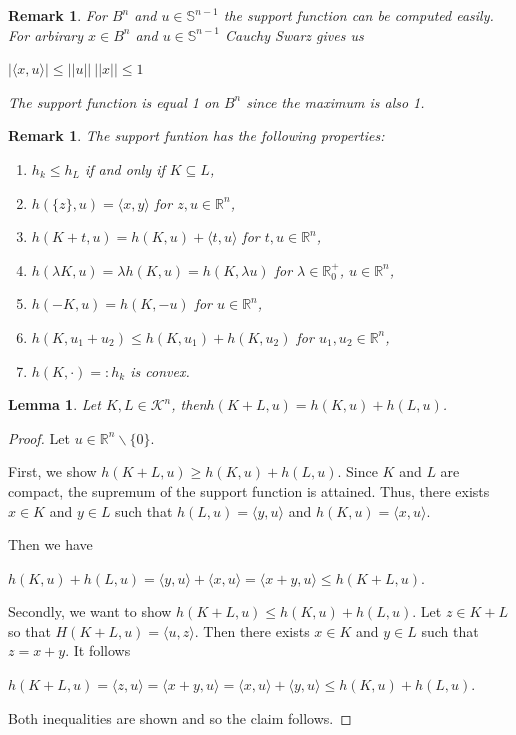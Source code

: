 \documentclass[a4paper]{book}
\newtheorem{lemma}[theorem]{Lemma}%
\newtheorem{remark}[theorem]{Remark}%
\numberwithin{theorem}{section}%
\begin{document}
\begin{remark}
	For $B^{n}$ and $u\in\mathbb{S}^{n-1}$ the support function can be computed easily. For arbirary $x\in B^{n}$ and $u\in\mathbb{S}^{n-1}$ Cauchy Swarz gives us
	\begin{center}
		$|\langle x,u\rangle|\leq||u||\:||x||\leq1$
	\end{center}
	The support function is equal 1 on $B^{n}$ since the maximum is also 1.
\end{remark}

\begin{remark}
	The support funtion has the following properties:
	\begin{enumerate}
		\item $h_{k}\leq h_{L}$ if and only if $K\subseteq L$,
		\item $h(\{z\},u)=\langle x,y\rangle$ for $z,u\in\mathbb{R}^{n}$,
		\item $h(K+t,u)=h(K,u)+\langle t,u\rangle$ for $t,u\in\mathbb{R}^{n}$,
		\item $h(\lambda K, u)=\lambda h(K,u)=h(K,\lambda u)$ for $\lambda\in\mathbb{R}_{0}^{+}$, $u\in\mathbb{R}^{n}$,
		\item $h(-K,u)=h(K,-u)$ for $u\in\mathbb{R}^{n}$,
		\item $h(K,u_{1}+u_{2})\leq h(K,u_{1})+h(K,u_{2})$ for $u_{1},u_{2}\in\mathbb{R}^{n}$,
		\item $h(K,\cdot)=: h_{k}$ is convex.
	\end{enumerate}
\end{remark}

\begin{lemma}
	Let $K,L\in\mathscr{K}^{n}$, then$h(K+L,u)=h(K,u)+h(L,u)$.
\end{lemma}
\begin{proof}
	Let $u\in\mathbb{R}^{n}\backslash\{0\}$.

    First, we show $h(K+L,u)\geq h(K,u)+h(L,u)$. Since $K$ and $L$ are compact, the supremum of the support function is attained. Thus, there exists $x\in K$ and $y\in L$ such that $h(L,u)=\langle y,u\rangle$ and $h(K,u)=\langle x,u\rangle$.

    Then we have
    \begin{center}
        $h(K,u)+h(L,u)=\langle y,u\rangle+\langle x,u\rangle=\langle x+y,u\rangle\leq h(K+L,u)$.
    \end{center}

    Secondly, we want to show $h(K+L,u)\leq h(K,u)+h(L,u)$. Let $z\in K+L$ so that $H(K+L,u)=\langle u,z\rangle$. Then there exists $x\in K$ and $y\in L$ such that $z=x+y$. It follows
    \begin{center}
        $h(K+L,u)=\langle z,u\rangle=\langle x+y,u\rangle=\langle x,u\rangle+\langle y,u\rangle\leq h(K,u)+h(L,u)$.
    \end{center}
    Both inequalities are shown and so the claim follows.
\end{proof}
\end{document}
